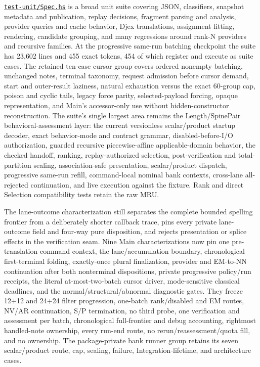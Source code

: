 \documentclass[10pt,letterpaper,oneside]{report}
\newcommand{\code}[1]{\texttt{\detokenize{#1}}}
\def\LeantBase{https://github.com/VladimirReshetnikov/Leant/blob/ada69d884480b93e74ee4b3daf77be38702ee07d/}
\newcommand{\lpath}[1]{\href{\LeantBase#1}{\nolinkurl{#1}}}
\begin{document}
\lpath{test-unit/Spec.hs} is a broad unit suite covering JSON, classifiers, snapshot metadata and publication, replay decisions, fragment parsing and analysis, provider queries and cache behavior, Djex translations, assignment fitting, rendering, candidate grouping, and many regressions around rank-N providers and recursive families. At the progressive same-run batching checkpoint the suite has 23{,}602 lines and 455 exact \code{testCase} tokens, 454 of which register and execute as suite cases. The retained ten-case cursor group covers ordered nonempty batching, unchanged notes, terminal taxonomy, request admission before cursor demand, start and outer-result laziness, natural exhaustion versus the exact 60-group cap, poison and cyclic tails, legacy force parity, selected-payload forcing, opaque representation, and Main's accessor-only use without hidden-constructor reconstruction. The suite's single largest area remains the Length/SpinePair behavioral-assessment layer: the current versionless scalar/product startup decoder, exact \code{:synth} behavior-mode and contract grammar, disabled-before-I/O authorization, guarded recursive piecewise-affine applicable-domain behavior, the checked handoff, ranking, replay-authorized selection, post-verification and total-partition sealing, association-safe presentation, scalar/product dispatch, progressive same-run refill, command-local nominal bank contexts, cross-lane all-rejected continuation, and live execution against the \code{djex-fake-z3} fixture. Rank and direct Selection compatibility tests retain the raw MRU.

The lane-outcome characterization still separates the complete bounded spelling frontier from a deliberately shorter callback trace, pins every private lane-outcome field and four-way pure disposition, and rejects presentation or splice effects in the verification seam. Nine Main characterizations now pin one pre-translation command context, the lane/accumulation boundary, chronological first-terminal folding, exactly-once plural finalization, provider and EM-to-NN continuation after both nonterminal dispositions, private progressive policy/run receipts, the literal at-most-two-batch cursor driver, mode-sensitive classical deadlines, and the normal/structural/abnormal diagnostic gates. They freeze 12+12 and 24+24 filter progression, one-batch rank/disabled and EM routes, NV/AR continuation, S/P termination, no third probe, one verification and assessment per batch, chronological full-frontier and debug accounting, rightmost handled-note ownership, every run-end route, no rerun/reassessment/quota fill, and no \code{ReplState} ownership. The package-private bank runner group retains its seven scalar/product route, cap, sealing, failure, Integration-lifetime, and architecture cases.
\end{document}
